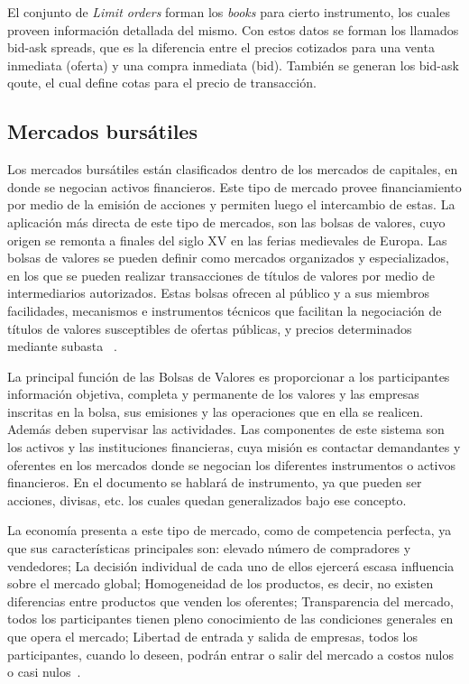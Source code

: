 El conjunto de \emph{Limit orders} forman los \emph{books} para cierto
instrumento, los cuales proveen información detallada del mismo. Con estos
datos se forman los llamados bid-ask spreads, que es la diferencia entre el
precios cotizados para una venta inmediata (oferta) y una compra inmediata
(bid).  También se generan los bid-ask qoute, el cual define cotas para el
precio de transacción.

\subsection{Mercados bursátiles}
Los mercados bursátiles están clasificados dentro de los mercados de capitales,
en donde se negocian activos financieros. Este tipo de mercado provee
financiamiento por medio de la emisión de acciones y permiten luego el
intercambio de estas. La aplicación más directa de este tipo de mercados, son
las bolsas de valores, cuyo origen se remonta a finales del siglo XV en las
ferias medievales de Europa. Las bolsas de valores se pueden definir como
mercados organizados y especializados, en los que se pueden realizar
transacciones de títulos de valores por medio de intermediarios autorizados.
Estas bolsas ofrecen al público y a sus miembros facilidades, mecanismos e
instrumentos técnicos que facilitan la negociación de títulos de valores
susceptibles de ofertas públicas, y precios determinados mediante subasta
~\cite{levine1998stock}.

La principal función de las Bolsas de Valores es proporcionar a los
participantes información objetiva, completa y permanente de los valores y las
empresas inscritas en la bolsa, sus emisiones y las operaciones que en ella se
realicen. Además deben supervisar las actividades. Las componentes de este
sistema son los activos y las instituciones financieras, cuya misión es
contactar demandantes y oferentes en los mercados donde se negocian los
diferentes instrumentos o activos financieros. En el documento se hablará de
instrumento, ya que pueden ser acciones, divisas, etc. los cuales quedan
generalizados bajo ese concepto.

La economía presenta a este tipo de mercado, como de competencia perfecta, ya
que sus características principales son: elevado número de compradores y
vendedores; La decisión individual de cada uno de ellos ejercerá escasa
influencia sobre el mercado global; Homogeneidad de los productos, es decir, no
existen diferencias entre productos que venden los oferentes; Transparencia del
mercado, todos los participantes tienen pleno conocimiento de las condiciones
generales en que opera el mercado; Libertad de entrada y salida de empresas,
todos los participantes, cuando lo deseen, podrán entrar o salir del mercado a
costos nulos o casi nulos~\cite{mankiw2011principles}. 

